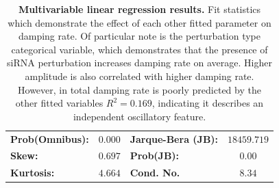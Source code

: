 \documentclass[11pt, letterpaper]{article}
\begin{document}
\begin{table}
\begin{center}
\begin{tabular}{lclc}
\textbf{Prob(Omnibus):} &$  0.000 $& \textbf{  Jarque-Bera (JB):  } &$18459.719$ \\
\textbf{Skew:}          &$  0.697 $& \textbf{  Prob(JB):          } &$     0.00$ \\
\textbf{Kurtosis:}      &$  4.664 $& \textbf{  Cond. No.          } &$     8.34$ \\
\bottomrule
\end{tabular}
\end{center} 
\caption{{\bfseries Multivariable linear regression results.} Fit statistics which demonstrate the effect of each other fitted parameter on damping rate. Of particular note is the perturbation type categorical variable, which demonstrates that the presence of siRNA perturbation increases damping rate on average. Higher amplitude is also correlated with higher damping rate. However, in total damping rate is poorly predicted by the other fitted variables $R^2 = 0.169$, indicating it describes an independent oscillatory feature.}
\label{tab:ols_reg}
\end{table}
\end{document}
